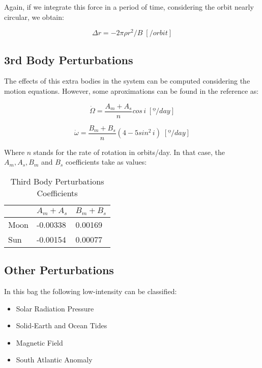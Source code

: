 Again, if we integrate this force in a period of time, considering the orbit nearly circular, we obtain:

\begin{equation}
\Delta r = -2 \pi \rho r^2/B \; [/orbit]
\end{equation}

\subsection{3rd Body Perturbations}
The effects of this extra bodies in the system can be computed considering the motion equations. However, some aproximations can be found in the reference as:

\begin{equation}
\dot{\Omega} = \frac{A_{m}+A_{s}}{n} cos \,i \;[º/day]
\end{equation}

\begin{equation}
\dot{\omega} = \frac{B_{m}+B_{s}}{n} (4 - 5sin^2 \,i)\;[º/day]
\end{equation}

Where $n$ stands for the rate of rotation in orbits/day. In that case, the $A_{m}, A_{s}, B_{m}$ and $B_{s}$ coefficients take as values:

\begin{table}[H]
\centering
\begin{tabular}{l|l|l|}
\cline{2-3}
                           & $A_{m}+A_{s}$ & $B_{m}+B_{s}$ \\ \hline
\multicolumn{1}{|l|}{Moon} & -0.00338      & 0.00169       \\ \hline
\multicolumn{1}{|l|}{Sun}  & -0.00154      & 0.00077       \\ \hline
\end{tabular}
\caption{Third Body Perturbations Coefficients}
\end{table}

\subsection{Other Perturbations}
In this bag the following low-intensity can be classified:

\begin{itemize}
\item Solar Radiation Pressure
\item Solid-Earth and Ocean Tides
\item Magnetic Field
\item South Atlantic Anomaly
\end{itemize}